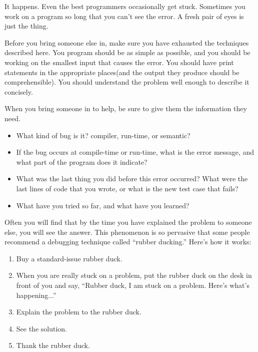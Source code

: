 \documentclass{book}
\begin{document}
It happens.  Even the best programmers occasionally get stuck.
Sometimes you work on a program so long that you can't see the
error.  A fresh pair of eyes is just the thing.

Before you bring someone else in, make sure you have exhausted
the techniques described here.  You program should be as simple
as possible, and you should be working on the smallest input
that causes the error.  You should have print statements in the
appropriate places(and the output they produce should be
comprehensible).  You should understand the problem well enough
to describe it concisely.

When you bring someone in to help, be sure to give
them the information they need.

\begin{itemize}

\item What kind of bug is it?  compiler, run-time, or
semantic?

\item If the bug occurs at compile-time or run-time, what is
the error message, and what part of the program does it indicate?

\item What was the last thing you did before this error occurred?
What were the last lines of code that you wrote, or what is
the new test case that fails?

\item What have you tried so far, and what have you learned? 

\end{itemize}

Often you will find that by the time you have explained the problem
to someone else, you will see the answer.  This phenomenon
is so pervasive that some people recommend a debugging technique
called ``rubber ducking.''  Here's how it works:

\begin{enumerate}

\item Buy a standard-issue rubber duck.

\item When you are really stuck on a problem, put the rubber
duck on the desk in front of you and say, ``Rubber duck, I
am stuck on a problem.  Here's what's happening...''

\item Explain the problem to the rubber duck.

\item See the solution.

\item Thank the rubber duck.

\end{enumerate}
\end{document}
